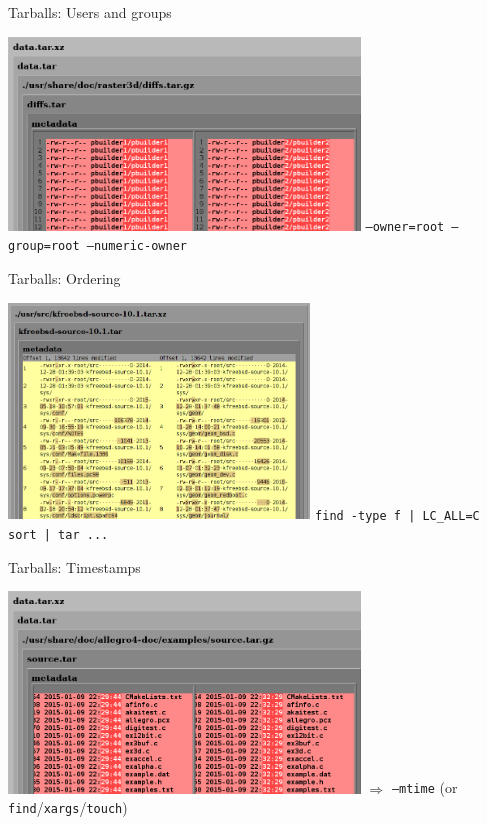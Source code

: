 \documentclass[14pt,aspectratio=169]{beamer}
\begin{document}
\begin{frame}{Tarballs: Users and groups}
 \begin{center}
  \includegraphics[width=0.7\textwidth]{images/examples/user_and_group_in_tarball.png}
  \vfill
  \texttt{--owner=root --group=root --numeric-owner}
 \end{center}
\end{frame}

\begin{frame}{Tarballs: Ordering}
 \begin{center}
  \includegraphics[width=0.6\textwidth]{images/examples/random_order_in_tarball.png}
  \vfill
  \texttt{find -type f | LC\_ALL=C sort | tar ...}
 \end{center}
\end{frame}

\begin{frame}{Tarballs: Timestamps}
 \begin{center}
  \includegraphics[width=0.7\textwidth]{images/examples/timestamps_in_tarball.png}
  \vfill
  $\Longrightarrow$ \texttt{--mtime} (or \texttt{find}/\texttt{xargs}/\texttt{touch})
 \end{center}
\end{frame}
\end{document}
